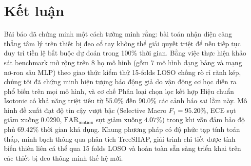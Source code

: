 \documentclass[conference]{IEEEtran}
\begin{document}
\section{Kết luận}
Bài báo đã chứng minh một cách tường minh rằng: bài toán nhận diện căng thẳng tâm lý trên thiết bị đeo cổ tay không thể giải quyết triệt để nếu tiếp tục duy trì tiền lệ bắt buộc dự đoán trong 100\% thời gian. Bằng việc thực hiện khảo sát benchmark mở rộng trên 8 họ mô hình (gồm 7 mô hình dạng bảng và mạng nơ-ron sâu MLP) theo giao thức kiểm thử 15-folds LOSO chống rò rỉ rãnh kép, chúng tôi đã chứng minh hiện tượng báo động giả do vận động cơ học diễn ra phổ biến trên mọi mô hình, và cơ chế Phân loại chọn lọc kết hợp Hiệu chuẩn Isotonic có khả năng triệt tiêu từ 55.0\% đến 90.0\% các cảnh báo sai lầm này. Mô hình đề xuất đạt độ tin cậy vượt bậc (Selective Macro $F_1 = 95.20\%$, ECE sụt giảm xuống $0.0290$, $\text{FAR}_{\text{motion}}$ sụt giảm xuống $4.07\%$) trong khi vẫn đảm bảo độ phủ $69.42\%$ thời gian khả dụng. Khung phương pháp có độ phức tạp tính toán thấp, minh bạch thông qua phân tích TreeSHAP, giải trình chi tiết được tính biến thiên liên cá thể qua 15 folds LOSO và hoàn toàn sẵn sàng triển khai trên các thiết bị đeo thông minh thế hệ mới.
\end{document}
